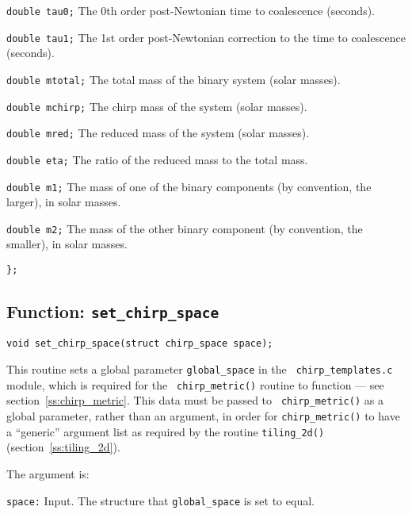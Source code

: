 \begin{description}
\item{\tt double tau0;}
  The 0th order post-Newtonian time to coalescence (seconds).

\item{\tt double tau1;}
  The 1st order post-Newtonian correction to the time to coalescence
  (seconds).

\item{\tt double mtotal;}
  The total mass of the binary system (solar masses).

\item{\tt double mchirp;}
  The chirp mass of the system (solar masses).

\item{\tt double mred;}
  The reduced mass of the system (solar masses).

\item{\tt double eta;}
  The ratio of the reduced mass to the total mass.

\item{\tt double m1;}
  The mass of one of the binary components (by convention, the
  larger), in solar masses.

\item{\tt double m2;}
  The mass of the other binary component (by convention, the smaller),
  in solar masses.

\end{description}
{\tt \};}


\clearpage
\subsection{Function: {\tt set\_chirp\_space}}
\label{ss:set_chirp_space}

\begin{verbatim}
void set_chirp_space(struct chirp_space space);
\end{verbatim}
This routine sets a global parameter {\tt global\_space} in the {\tt
chirp\_templates.c} module, which is required for the {\tt
chirp\_metric()} routine to function --- see
section~\ref{ss:chirp_metric}.  This data must be passed to {\tt
chirp\_metric()} as a global parameter, rather than an argument, in
order for {\tt chirp\_metric()} to have a ``generic'' argument list as
required by the routine {\tt tiling\_2d()}
(section~\ref{ss:tiling_2d}).

The argument is:

\begin{description}
\item{\tt space:}
  Input.  The structure that {\tt global\_space} is set to equal.
\end{description}


